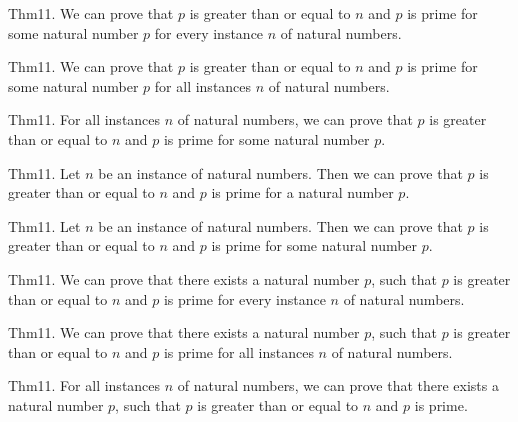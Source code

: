 \documentclass{article}
\begin{document}
Thm11. We can prove that $p$ is greater than or equal to $n$ and $p$ is prime for some natural number $p$ for every instance $n$ of natural numbers.

Thm11. We can prove that $p$ is greater than or equal to $n$ and $p$ is prime for some natural number $p$ for all instances $n$ of natural numbers.

Thm11. For all instances $n$ of natural numbers, we can prove that $p$ is greater than or equal to $n$ and $p$ is prime for some natural number $p$.

Thm11. Let $n$ be an instance of natural numbers. Then we can prove that $p$ is greater than or equal to $n$ and $p$ is prime for a natural number $p$.

Thm11. Let $n$ be an instance of natural numbers. Then we can prove that $p$ is greater than or equal to $n$ and $p$ is prime for some natural number $p$.

Thm11. We can prove that there exists a natural number $p$, such that $p$ is greater than or equal to $n$ and $p$ is prime for every instance $n$ of natural numbers.

Thm11. We can prove that there exists a natural number $p$, such that $p$ is greater than or equal to $n$ and $p$ is prime for all instances $n$ of natural numbers.

Thm11. For all instances $n$ of natural numbers, we can prove that there exists a natural number $p$, such that $p$ is greater than or equal to $n$ and $p$ is prime.
\end{document}

